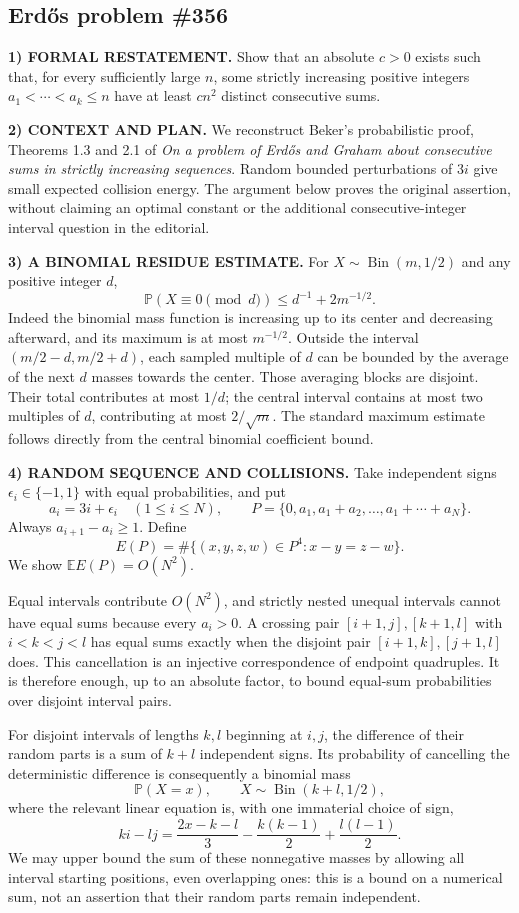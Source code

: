 \subsection*{Erd\H{o}s problem \#356}

\noindent\textbf{1) FORMAL RESTATEMENT.}
Show that an absolute $c>0$ exists such that, for every sufficiently large $n$, some strictly increasing positive integers $a_1<\cdots<a_k\le n$ have at least $cn^2$ distinct consecutive sums.

\noindent\textbf{2) CONTEXT AND PLAN.}
We reconstruct Beker's probabilistic proof, Theorems 1.3 and 2.1 of \emph{On a problem of Erd\H{o}s and Graham about consecutive sums in strictly increasing sequences}. Random bounded perturbations of $3i$ give small expected collision energy. The argument below proves the original assertion, without claiming an optimal constant or the additional consecutive-integer interval question in the editorial.

\noindent\textbf{3) A BINOMIAL RESIDUE ESTIMATE.}
For $X\sim\operatorname{Bin}(m,1/2)$ and any positive integer $d$,
\[
 \mathbb P(X\equiv0\pmod d)\le d^{-1}+2m^{-1/2}. \tag{1}
\]
Indeed the binomial mass function is increasing up to its center and decreasing afterward, and its maximum is at most $m^{-1/2}$. Outside the interval $(m/2-d,m/2+d)$, each sampled multiple of $d$ can be bounded by the average of the next $d$ masses towards the center. Those averaging blocks are disjoint. Their total contributes at most $1/d$; the central interval contains at most two multiples of $d$, contributing at most $2/\sqrt m$. The standard maximum estimate follows directly from the central binomial coefficient bound.

\noindent\textbf{4) RANDOM SEQUENCE AND COLLISIONS.}
Take independent signs $\epsilon_i\in\{-1,1\}$ with equal probabilities, and put
\[
 a_i=3i+\epsilon_i\quad(1\le i\le N),\qquad
 P=\{0,a_1,a_1+a_2,\ldots,a_1+\cdots+a_N\}.
\]
Always $a_{i+1}-a_i\ge1$. Define
\[
 E(P)=\#\{(x,y,z,w)\in P^4:x-y=z-w\}.
\]
We show $\mathbb E E(P)=O(N^2)$.

Equal intervals contribute $O(N^2)$, and strictly nested unequal intervals cannot have equal sums because every $a_i>0$. A crossing pair $[i+1,j],[k+1,l]$ with $i<k<j<l$ has equal sums exactly when the disjoint pair $[i+1,k],[j+1,l]$ does. This cancellation is an injective correspondence of endpoint quadruples. It is therefore enough, up to an absolute factor, to bound equal-sum probabilities over disjoint interval pairs.

For disjoint intervals of lengths $k,l$ beginning at $i,j$, the difference of their random parts is a sum of $k+l$ independent signs. Its probability of cancelling the deterministic difference is consequently a binomial mass
\[
 \mathbb P(X=x),\qquad X\sim\operatorname{Bin}(k+l,1/2),
\]
where the relevant linear equation is, with one immaterial choice of sign,
\[
 ki-lj=\frac{2x-k-l}{3}-\frac{k(k-1)}2+\frac{l(l-1)}2. \tag{2}
\]
We may upper bound the sum of these nonnegative masses by allowing all interval starting positions, even overlapping ones: this is a bound on a numerical sum, not an assertion that their random parts remain independent.

